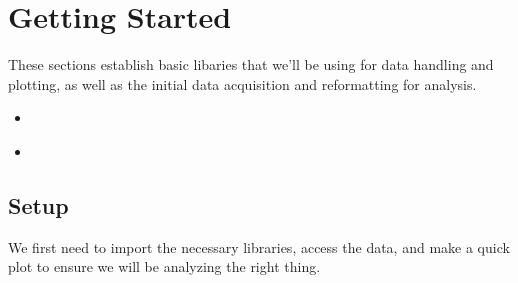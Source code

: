 \documentclass[letterpaper,10pt,english]{jupyterBook}
\begin{document}
\sphinxstepscope


\chapter{Getting Started}
\label{\detokenize{gettingStarted:getting-started}}\label{\detokenize{gettingStarted::doc}}
\sphinxAtStartPar
These sections establish basic libaries that we’ll be using for data handling and plotting, as well as the initial data acquisition and reformatting for analysis.
\begin{itemize}
\item {} 
\sphinxAtStartPar
{\hyperref[\detokenize{notebooks/setup::doc}]{}}

\item {} 
\sphinxAtStartPar
{\hyperref[\detokenize{notebooks/SL_Data_Wrangling::doc}]{}}

\end{itemize}

\sphinxstepscope


\section{Setup}
\label{\detokenize{notebooks/setup:setup}}\label{\detokenize{notebooks/setup::doc}}
\sphinxAtStartPar
We first need to import the necessary libraries, access the data, and make a quick plot to ensure we will be analyzing the right thing.
\end{document}
